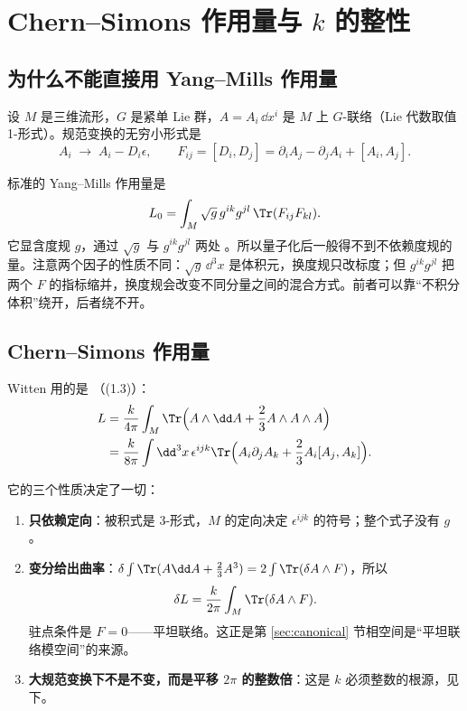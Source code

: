 \section{Chern--Simons 作用量与 $k$ 的整性}
\label{sec:cs}

\subsection{为什么不能直接用 Yang--Mills 作用量}

设 $M$ 是三维流形，$G$ 是紧单 Lie 群，$A=A_i\,\dd x^i$ 是 $M$ 上 $G$-联络（Lie 代数取值 1-形式）。规范变换的无穷小形式是 
\begin{equation}
A_i\;\longrightarrow\; A_i-D_i\epsilon ,\qquad
F_{ij}=[D_i,D_j]=\partial_iA_j-\partial_jA_i+[A_i,A_j].
\label{eq:gauge}
\end{equation}

标准的 Yang--Mills 作用量是
\begin{equation}
L_0=\int_M\sqrt{g}\,g^{ik}g^{jl}\,\Tr(F_{ij}F_{kl}) .
\label{eq:ym}
\end{equation}
它显含度规 $g$，通过 $\sqrt g$ 与 $g^{ik}g^{jl}$ 两处 。所以量子化后一般得不到不依赖度规的量。注意两个因子的性质不同：$\sqrt g\,\dd^3x$ 是体积元，换度规只改标度；但 $g^{ik}g^{jl}$ 把两个 $F$ 的指标缩并，换度规会改变不同分量之间的混合方式。前者可以靠“不积分体积”绕开，后者绕不开。

\subsection{Chern--Simons 作用量}

Witten 用的是 （(1.3)）：
\begin{equation}
\begin{aligned}
L&=\frac{k}{4\pi}\int_M \Tr\Bigl(A\wedge \dd A+\frac23 A\wedge A\wedge A\Bigr)\\
 &=\frac{k}{8\pi}\int \dd^3x\,\epsilon^{ijk}\Tr\Bigl(A_i\partial_jA_k+\frac23 A_i[A_j,A_k]\Bigr).
\end{aligned}
\label{eq:cs}
\end{equation}

它的三个性质决定了一切：
\begin{enumerate}[leftmargin=2em]
\item \textbf{只依赖定向}：被积式是 3-形式，$M$ 的定向决定 $\epsilon^{ijk}$ 的符号；整个式子没有 $g$。
\item \textbf{变分给出曲率}：$\delta\int\Tr(A\dd A+\tfrac23A^3)=2\int\Tr(\delta A\wedge F)$，所以 \ours
\begin{equation}
\delta L=\frac{k}{2\pi}\int_M \Tr(\delta A\wedge F).
\label{eq:var}
\end{equation}
驻点条件是 $F=0$——平坦联络。这正是第 \ref{sec:canonical} 节相空间是“平坦联络模空间”的来源。
\item \textbf{大规范变换下不是不变，而是平移 $2\pi$ 的整数倍}：这是 $k$ 必须整数的根源，见下。
\end{enumerate}

